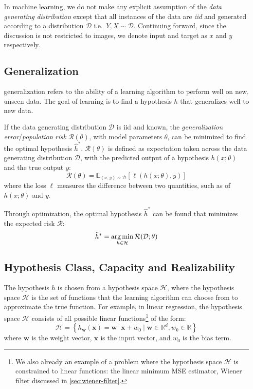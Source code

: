 In machine learning, we do not make any explicit assumption of the \textit{data generating distribution} except that all instances of the data are \textit{\gls{iid}} and generated according to a distribution $\mathcal{D}$ i.e.\ $Y, X \sim \mathcal{D}$. Continuing forward, since the discussion is not restricted to images, we denote input and target as $x$ and $y$ respectively. 

\subsection{Generalization}\label{sec:generalization}
\Gls{generalization} refers to the ability of a learning algorithm to perform well on new, unseen data. The goal of learning is to find a hypothesis $h$ that generalizes well to new data. 

If the data generating distribution $\mathcal{D}$ is \gls{iid} and known, the \textit{generalization error}/\textit{population risk} $\mathcal{R}(\theta)$, with model parameters $\theta$, can be minimized to find the optimal hypothesis $\hat{h}^*$. $\mathcal{R}(\theta)$ is defined as expectation taken across the data generating distribution $\mathcal{D}$, with the predicted output of a hypothesis $h(x; \theta)$ and the true output $y$:
\begin{equation}\label{eq:risk}
    \mathcal{R}(\theta) = \mathbb{E}_{(x, y) \sim \mathcal{D}} \left[ \ell(h(x; \theta), y) \right]
\end{equation}
where the loss $\ell$ measures the difference between two quantities, such as of $h(x; \theta)$ and $y$.

Through optimization, the optimal hypothesis $\hat{h}^*$ can be found that minimizes the expected risk $\mathcal{R}$:
\begin{equation}\label{eq:risk-min}
    \hat{h}^* = \operatorname*{arg\,min}_{h \in \mathcal{H}} \mathcal{R}(\mathcal{D}; \theta)
\end{equation}

\subsection{Hypothesis Class, Capacity and Realizability}
The hypothesis $h$ is chosen from a hypothesis space $\mathcal{H}$, where the hypothesis space $\mathcal{H}$ is the set of functions that the learning algorithm can choose from to approximate the true function. 
For example, in linear regression, the hypothesis space $\mathcal{H}$ consists of all possible linear functions\footnote{We also already an example of a problem where the hypothesis space $\mathcal{H}$ is constrained to linear functions: the linear minimum \gls{MSE} estimator, Wiener filter discussed in \cref{sec:wiener-filter}.} of the form:
\begin{equation}\label{eq:linear-hypothesis}
   \mathcal{H} =  \left\{ h_{\mathbf{w}}(\mathbf{x}) = \mathbf{w}^\top \mathbf{x} + w_0 \mid \mathbf{w} \in \mathbb{R}^d, w_0 \in \mathbb{R} \right\}
\end{equation}
where $\mathbf{w}$ is the weight vector, $\mathbf{x}$ is the input vector, and $w_0$ is the bias term. 

